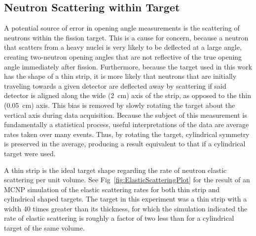 \subsection{Neutron Scattering within Target}
\label{subsection:Elastic_scattering}
A potential source of error in opening angle measurements is the scattering of neutrons within the fission target.
This is a cause for concern, because a neutron that scatters from a heavy nuclei is very likely to be deflected at a large angle, creating two-neutron opening angles that are not reflective of the true opening angle immediately after fission.
Furthermore, because the target used in this work has the shape of a thin strip, it is more likely that neutrons that are initially traveling towards a given detector are deflected away by scattering if said detector is aligned along the wide (2~cm) axis of the strip, as opposed to the thin (0.05~cm) axis.
This bias is removed by slowly rotating the target about the vertical axis during data acquisition.
Because the subject of this measurement is fundamentally a statistical process, useful interpretations of the data are average rates taken over many events.
Thus, by rotating the target, cylindrical symmetry is preserved in the average, producing a result equivalent to that if a cylindrical target were used.

A thin strip is the ideal target shape regarding the rate of neutron elastic scattering per unit volume.
See Fig~\ref{fig:ElasticScatteringPlot} for the result of an MCNP simulation of the elastic scattering rates for both thin strip and cylindrical shaped targets.
The target in this experiment was a thin strip with a width 40 times greater than its thickness, for which the simulation indicated the rate of elastic scattering is roughly a factor of two less than for a cylindrical target of the same volume.

